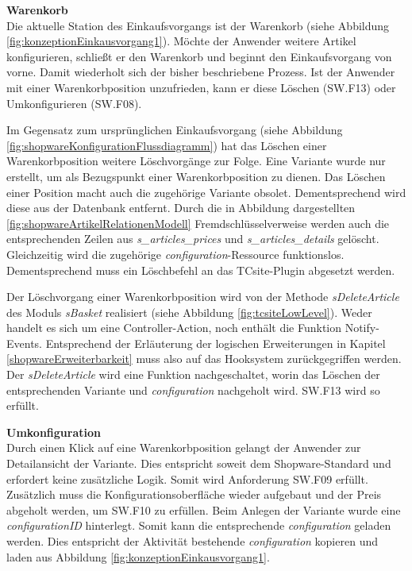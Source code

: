 \documentclass[11pt, a4paper, titlepage, listof=totoc, bibliography=totoc, index=totoc, twoside, openright, headings=normal, draft]{scrreprt}
\begin{document}
\textbf{Warenkorb}\\
Die aktuelle Station des Einkaufsvorgangs ist der Warenkorb (siehe Abbildung \ref{fig:konzeptionEinkausvorgang1}). Möchte der Anwender weitere Artikel konfigurieren, schließt er den Warenkorb und beginnt den Einkaufsvorgang von vorne. Damit wiederholt sich der bisher beschriebene Prozess. Ist der Anwender mit einer Warenkorbposition unzufrieden, kann er diese Löschen (SW.F13) oder Umkonfigurieren (SW.F08).

Im Gegensatz zum ursprünglichen Einkaufsvorgang (siehe Abbildung \ref{fig:shopwareKonfigurationFlussdiagramm}) hat das Löschen einer Warenkorbposition weitere Löschvorgänge zur Folge. Eine Variante wurde nur erstellt, um als Bezugspunkt einer Warenkorbposition zu dienen. Das Löschen einer Position macht auch die zugehörige Variante obsolet. Dementsprechend wird diese aus der Datenbank entfernt. Durch die in Abbildung dargestellten \ref{fig:shopwareArtikelRelationenModell} Fremdschlüsselverweise werden auch die entsprechenden Zeilen aus \emph{s\_articles\_prices} und \emph{s\_articles\_details}  gelöscht. Gleichzeitig wird die zugehörige \emph{configuration}-Ressource funktionslos. Dementsprechend muss ein Löschbefehl an das TCsite-Plugin abgesetzt werden.

Der Löschvorgang einer Warenkorbposition wird von der Methode \emph{sDeleteArticle} des Moduls \emph{sBasket} realisiert (siehe Abbildung \ref{fig:tcsiteLowLevel}). Weder handelt es sich um eine Controller-Action, noch enthält die Funktion Notify-Events. Entsprechend der Erläuterung der logischen Erweiterungen in Kapitel \ref{shopwareErweiterbarkeit} muss also auf das Hooksystem zurückgegriffen werden. Der \emph{sDeleteArticle} wird eine Funktion nachgeschaltet, worin das Löschen der entsprechenden Variante und \emph{configuration} nachgeholt wird. SW.F13 wird so erfüllt.

\textbf{Umkonfiguration}\\
Durch einen Klick auf eine Warenkorbposition gelangt der Anwender zur Detailansicht der Variante. Dies entspricht soweit dem Shopware-Standard und erfordert keine zusätzliche Logik. Somit wird Anforderung SW.F09 erfüllt. Zusätzlich muss die Konfigurationsoberfläche wieder aufgebaut und der Preis abgeholt werden, um SW.F10 zu erfüllen. Beim Anlegen der Variante wurde eine \emph{configurationID} hinterlegt. Somit kann die entsprechende \emph{configuration} geladen werden. Dies entspricht der Aktivität \glqq bestehende \emph{configuration} kopieren und laden\grqq{} aus Abbildung \ref{fig:konzeptionEinkausvorgang1}.
\end{document}
